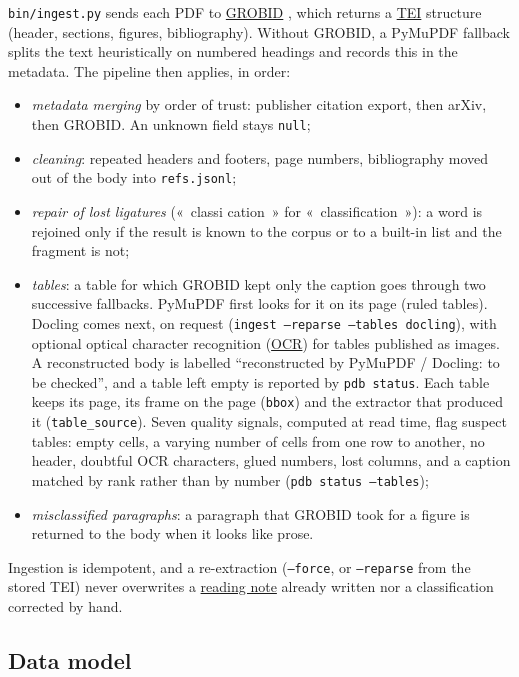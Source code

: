 \documentclass[11pt,a4paper]{article}
\newcommand{\cmd}[1]{\texttt{#1}}
\newcommand{\gl}[2]{\hyperlink{gl:#1}{\textcolor{glcolor}{#2}}}
\begin{document}
\cmd{bin/ingest.py} sends each PDF to \gl{GROBID}{GROBID} \citep{grobid}, which returns a \gl{TEI}{TEI} structure
(header, sections, figures, bibliography). Without GROBID, a PyMuPDF fallback splits the text
heuristically on numbered headings and records this in the metadata. The pipeline then
applies, in order:
\begin{itemize}
  \item \emph{metadata merging} by order of trust: publisher citation export, then arXiv,
    then GROBID. An unknown field stays \cmd{null};
  \item \emph{cleaning}: repeated headers and footers, page numbers, bibliography moved out
    of the body into \cmd{refs.jsonl};
  \item \emph{repair of lost ligatures} («~classi cation~» for «~classification~»): a word
    is rejoined only if the result is known to the corpus or to a built-in list and the
    fragment is not;
  \item \emph{tables}: a table for which GROBID kept only the caption goes through two
    successive fallbacks. PyMuPDF first looks for it on its page (ruled tables). Docling
    \citep{auer2024docling} comes next, on request (\cmd{ingest --reparse --tables
    docling}), with optional optical character recognition (\gl{OCR}{OCR}) for tables published as
    images. A reconstructed body is labelled ``reconstructed by PyMuPDF / Docling: to be
    checked'', and a table left empty is reported by \cmd{pdb status}. Each table keeps its
    page, its frame on the page (\cmd{bbox}) and the extractor that produced it
    (\cmd{table\_source}). Seven quality signals, computed at read time, flag suspect tables:
    empty cells, a varying number of cells from one row to another, no header, doubtful OCR
    characters, glued numbers, lost columns, and a caption matched by rank rather than by
    number (\cmd{pdb status --tables});
  \item \emph{misclassified paragraphs}: a paragraph that GROBID took for a figure is
    returned to the body when it looks like prose.
\end{itemize}
Ingestion is idempotent, and a re-extraction (\cmd{--force}, or \cmd{--reparse} from the
stored TEI) never overwrites a \gl{fiche}{reading note} already written nor a classification corrected
by hand.

\subsection{Data model}
\label{sec:data}
\end{document}
